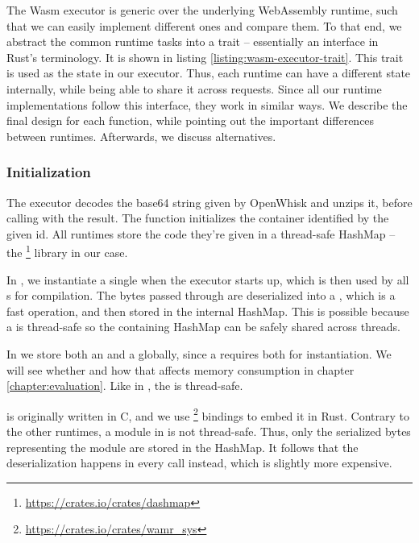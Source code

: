 The Wasm executor is generic over the underlying WebAssembly runtime, such that we can easily implement different ones and compare them. To that end, we abstract the common runtime tasks into a trait -- essentially an interface in Rust's terminology. It is shown in listing \ref{listing:wasm-executor-trait}. This trait is used as the state in our executor. Thus, each runtime can have a different state internally, while being able to share it across requests. Since all our runtime implementations follow this interface, they work in similar ways. We describe the final design for each function, while pointing out the important differences between runtimes. Afterwards, we discuss alternatives.

\subsubsection{Initialization}
The executor decodes the base64 string given by OpenWhisk and unzips it, before calling  with the result. The function initializes the container identified by the given id. All runtimes store the code they're given in a thread-safe HashMap -- the  \footnote{\url{https://crates.io/crates/dashmap}} library in our case.

\begin{description}[style=multiline, leftmargin=2.5cm, font=\bfseries]

    \item[Wasmtime] In , we instantiate a single  when the executor starts up, which is then used by all s for compilation. The bytes passed through  are deserialized into a , which is a fast operation, and then stored in the internal HashMap. This is possible because a  is thread-safe so the containing HashMap can be safely shared across threads.

    \item[Wasmer] In  we store both an  and a  globally, since a  requires both for instantiation. We will see whether and how that affects memory consumption in chapter \ref{chapter:evaluation}. Like in , the  is thread-safe.

    \item[Wamr]  is originally written in C, and we use  \footnote{\url{https://crates.io/crates/wamr_sys}} bindings to embed it in Rust. Contrary to the other runtimes, a module in  is not thread-safe. Thus, only the serialized bytes representing the module are stored in the HashMap. It follows that the deserialization happens in every  call instead, which is slightly more expensive.

\end{description}

